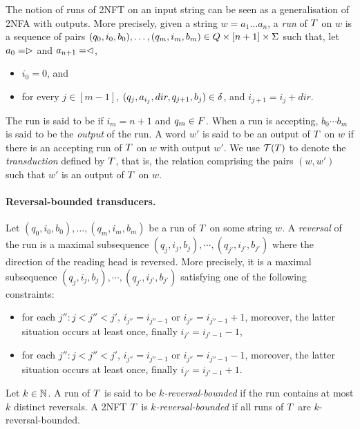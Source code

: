 

The notion of runs of 2NFT on an input string can be seen as a generalisation of 2NFA with outputs. More precisely, given a string $w = a_1 \dots a_n$, a \emph{run} of $T$ on $w$
is a
sequence of pairs $(q_0, i_0, b_0),\ldots, (q_m, i_m, b_m) \in Q \times [n+1] \times \Sigma$ 
such that, let $a_0 = \vartriangleright$ and $a_{n+1} = \vartriangleleft$, %
\begin{itemize}
    \item $i_0 = 0$, and
    \item for every $j \in [m-1]$, $(q_j, a_{i_j}, dir, q_{j+1}, b_j) \in
        \delta$, and $i_{j+1} = i_j + dir$.
\end{itemize}
The run is said to be  if $i_m = n+1$ and $q_m \in F$. When a run is accepting, $b_0 \cdots b_m$ is said to be the \emph{output} of the run.
A word $w'$ is said to be an output of $T$ on $w$ if there is an accepting run of
$T$ on $w$ with output $w'$. We use $\mathcal{T}(T)$ to denote the \emph{transduction} defined by $T$, that is, the relation comprising the pairs $(w,w')$ such that $w'$ is an output of $T$ on $w$.

\paragraph{Reversal-bounded transducers.}    
Let $(q_0, i_0, b_0),\ldots, (q_m, i_m, b_m) $ be a run of $T$ on some string $w$. A \emph{reversal} of the run is a maximal subsequence $(q_j, i_j , b_j), \cdots, (q_{j'}, i_{j'}, b_{j'})$ where the direction of the reading head is reversed. More precisely, it is a maximal subsequence $(q_j, i_j , b_j), \cdots, (q_{j'}, i_{j'}, b_{j'})$ satisfying one of the following constraints:
\begin{itemize}
\item for each $j'': j  < j'' < j'$, $i_{j''} = i_{j''-1}$ or $i_{j''} = i_{j''-1}+1$, moreover, the latter situation occurs at least once, finally $i_{j'} = i_{j'-1}-1$,
\item for each $j'': j  < j'' < j'$, $i_{j''} = i_{j''-1}$ or $i_{j''} = i_{j''-1}-1$, moreover, the latter situation occurs at least once, finally $i_{j'} = i_{j'-1}+1$. 
\end{itemize}
Let $k \in \mathbb{N}$. A run of $T$ is said to be \emph{$k$-reversal-bounded} if the run contains at most $k$ distinct reversals.
A 2NFT $T$ is \emph{$k$-reversal-bounded} if all runs of  $T$ are $k$-reversal-bounded.


